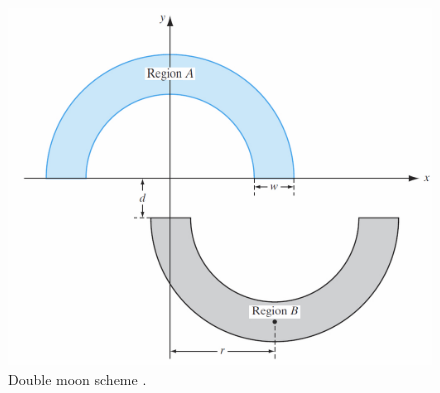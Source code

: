 \begin{figure}[!h]
\centering
\includegraphics[width=.6\columnwidth]{images/105doublemoon2}
\caption[Double moon scheme]{Double moon scheme \cite{RefWorks:158}.}
\label{fig:105doublemoon2}
\end{figure}